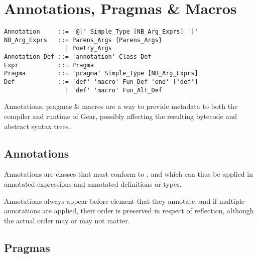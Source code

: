 
\chapter{Annotations, Pragmas \& Macros}
\label{sec:annotations}
\label{sec:pragmas}
\label{sec:macros}

\minitoc


\syntax\begin{lstlisting}
Annotation     ::= '@[' Simple_Type [NB_Arg_Exprs] ']'
NB_Arg_Exprs   ::= Parens_Args {Parens_Args}
                 | Poetry_Args
Annotation_Def ::= 'annotation' Class_Def
Expr           ::= Pragma
Pragma         ::= 'pragma' Simple_Type [NB_Arg_Exprs]
Def            ::= 'def' 'macro' Fun_Def 'end' ['def']
                 | 'def' 'macro' Fun_Alt_Def
\end{lstlisting}

Annotations, pragmas \& macros are a way to provide metadata to both the compiler and runtime of Gear, possibly affecting the resulting bytecode and abstract syntax trees. 





\section{Annotations}

Annotations are classes that must conform to , and which can thus be applied in annotated expressions and annotated definitions or types. 

Annotations always appear before element that they annotate, and if multiple annotations are applied, their order is preserved in respect of reflection, although the actual order may or may not matter. 






\section{Pragmas}
\label{sec:pragmas}

